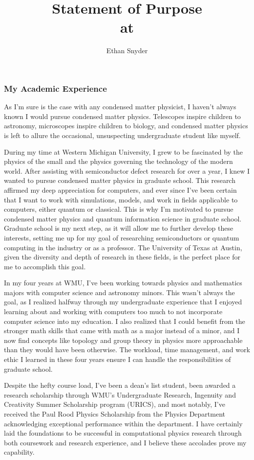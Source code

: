 \documentclass[11pt]{article}
\title{\vspace{-5em}Statement of Purpose\\
	\large \dept{} at \school{}}
\author{Ethan Snyder}
\date{}
\newcommand{\school}{University of Texas at Austin}
\begin{document}
\maketitle
\subsubsection*{My Academic Experience}
As I'm sure is the case with any condensed matter physicist, I haven't always known I would pursue condensed matter physics. Telescopes inspire children to astronomy, microscopes inspire children to biology, and condensed matter physics is left to allure the occasional, unsuspecting undergraduate student like myself.

During my time at Western Michigan University, I grew to be fascinated by the physics of the small and the physics governing the technology of the modern world. After assisting with semiconductor defect research for over a year, I knew I wanted to pursue condensed matter physics in graduate school. This research affirmed my deep appreciation for computers, and ever since I've been certain that I want to work with simulations, models, and work in fields applicable to computers, either quantum or classical. This is why I'm motivated to pursue condensed matter physics and quantum information science in graduate school. Graduate school is my next step, as it will allow me to further develop these interests, setting me up for my goal of researching semiconductors or quantum computing in the industry or as a professor. The \school{}, given the diversity and depth of research in these fields, is the perfect place for me to accomplish this goal.

In my four years at WMU, I've been working towards physics and mathematics majors with computer science and astronomy minors. This wasn't always the goal, as I realized halfway through my undergraduate experience that I enjoyed learning about and working with computers too much to not incorporate computer science into my education. I also realized that I could benefit from the stronger math skills that came with math as a major instead of a minor, and I now find concepts like topology and group theory in physics more approachable than they would have been otherwise. The workload, time management, and work ethic I learned in these four years ensure I can handle the responsibilities of graduate school.

Despite the hefty course load, I've been a dean's list student, been awarded a research scholarship through WMU's Undergraduate Research, Ingenuity and Creativity Summer Scholarship program (URICS), and most notably, I've received the Paul Rood Physics Scholarship from the Physics Department acknowledging exceptional performance within the department. I have certainly laid the foundations to be successful in computational physics research through both coursework and research experience, and I believe these accolades prove my capability.
\end{document}
